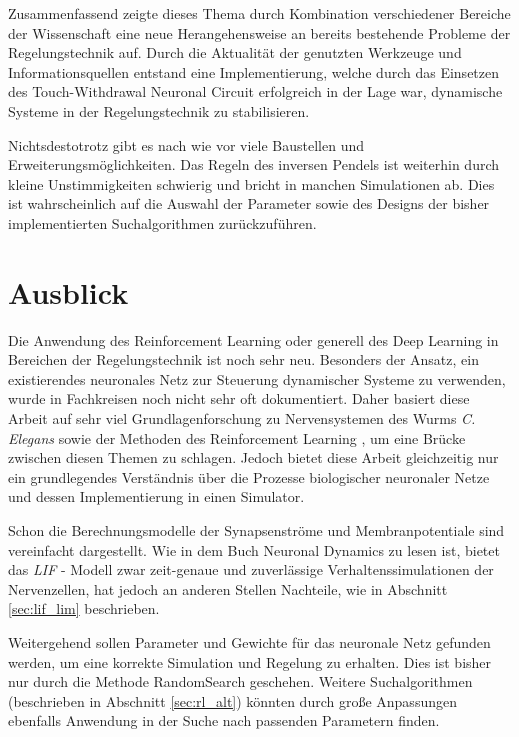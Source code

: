 	Zusammenfassend zeigte dieses Thema durch Kombination verschiedener Bereiche der Wissenschaft eine neue Herangehensweise an bereits bestehende Probleme der Regelungstechnik auf. Durch die Aktualität der genutzten Werkzeuge und Informationsquellen entstand eine Implementierung, welche durch das Einsetzen des Touch-Withdrawal Neuronal Circuit \cite{WormLevelRL} erfolgreich in der Lage war, dynamische Systeme in der Regelungstechnik zu stabilisieren.
	
	Nichtsdestotrotz gibt es nach wie vor viele Baustellen und Erweiterungsmöglichkeiten. Das Regeln des inversen Pendels ist weiterhin durch kleine Unstimmigkeiten schwierig und bricht in manchen Simulationen ab. Dies ist wahrscheinlich auf die Auswahl der Parameter sowie des Designs der bisher implementierten Suchalgorithmen zurückzuführen.

\section{Ausblick}
\label{sec:erg_ausblick}
	Die Anwendung des Reinforcement Learning oder generell des Deep Learning in Bereichen der Regelungstechnik ist noch sehr neu. Besonders der Ansatz, ein existierendes neuronales Netz zur Steuerung dynamischer Systeme zu verwenden, wurde in Fachkreisen noch nicht sehr oft dokumentiert. Daher basiert diese Arbeit auf sehr viel Grundlagenforschung zu Nervensystemen des Wurms \textit{C. Elegans} \cite{CElegans} sowie der Methoden des Reinforcement Learning \cite{DeepLearning} \cite{Russell2016}, um eine Brücke zwischen diesen Themen zu schlagen. Jedoch bietet diese Arbeit gleichzeitig nur ein grundlegendes Verständnis über die Prozesse biologischer neuronaler Netze und dessen Implementierung in einen Simulator.
	
	Schon die Berechnungsmodelle der Synapsenströme und Membranpotentiale sind vereinfacht dargestellt. Wie in dem Buch Neuronal Dynamics \cite{NeuronalDynamics} zu lesen ist, bietet das \textit{LIF} - Modell zwar zeit-genaue und zuverlässige Verhaltenssimulationen der Nervenzellen, hat jedoch an anderen Stellen Nachteile, wie in Abschnitt \ref{sec:lif_lim} beschrieben.
	
	Weitergehend sollen Parameter und Gewichte für das neuronale Netz gefunden werden, um eine korrekte Simulation und Regelung zu erhalten. Dies ist bisher nur durch die Methode RandomSearch geschehen. Weitere Suchalgorithmen (beschrieben in Abschnitt \ref{sec:rl_alt}) könnten durch große Anpassungen ebenfalls Anwendung in der Suche nach passenden Parametern finden.
	
